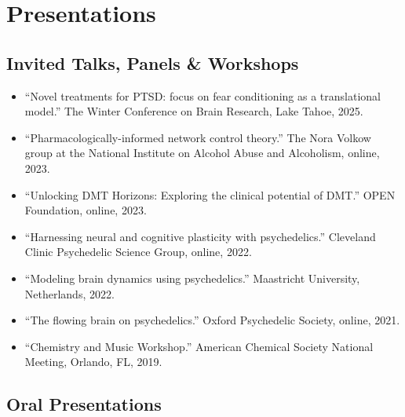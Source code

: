 \documentclass[11pt, letterpaper]{article}
\begin{document}
\section{Presentations}

\subsection{Invited Talks, Panels \& Workshops}

\begin{itemize}
  \item ``Novel treatments for PTSD: focus on fear conditioning as a translational model.'' The Winter Conference on Brain Research, Lake Tahoe, 2025.
  \item ``Pharmacologically-informed network control theory.'' The Nora Volkow group at the National Institute on Alcohol Abuse and Alcoholism, online, 2023.
  \item ``Unlocking DMT Horizons: Exploring the clinical potential of DMT.'' OPEN Foundation, online, 2023.
  \item ``Harnessing neural and cognitive plasticity with psychedelics.'' Cleveland Clinic Psychedelic Science Group, online, 2022.
  \item ``Modeling brain dynamics using psychedelics.'' Maastricht University, Netherlands, 2022.
  \item ``The flowing brain on psychedelics.'' Oxford Psychedelic Society, online, 2021.
  \item ``Chemistry and Music Workshop.'' American Chemical Society National Meeting, Orlando, FL, 2019.
\end{itemize}

\subsection{Oral Presentations}
\end{document}

